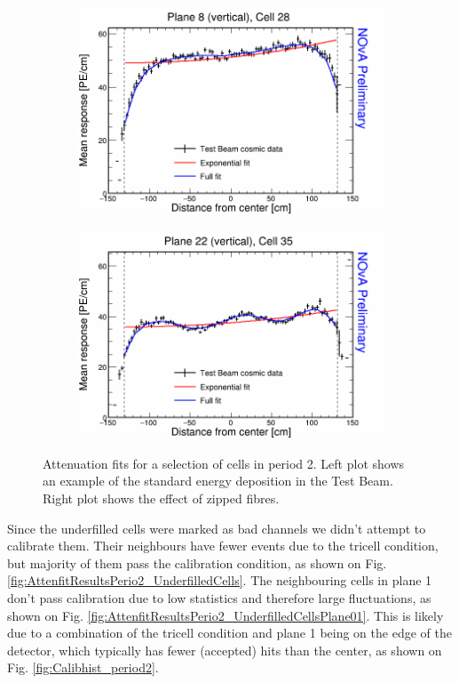 \begin{figure}[h]
  \begin{subfigure}{0.5\textwidth}
    \includegraphics[width=\linewidth]{RelativeCalibrationResults/p2_008_028.png}
  \end{subfigure}
  \begin{subfigure}{0.5\textwidth}
    \includegraphics[width=\linewidth]{RelativeCalibrationResults/p2_022_035.png}
  \end{subfigure}
  \caption{Attenuation fits for a selection of cells in period 2. Left plot shows an example of the standard energy deposition in the Test Beam. Right plot shows the effect of zipped fibres.}
  \label{fig:AttenfitResultsPerio2_ZippedFibers}
\end{figure}

Since the underfilled cells were marked as bad channels we didn't attempt to calibrate them. Their neighbours have fewer events due to the tricell condition, but majority of them pass the calibration condition, as shown on Fig. \ref{fig:AttenfitResultsPerio2_UnderfilledCells}. The neighbouring cells in plane 1 don't pass calibration due to low statistics and therefore large fluctuations, as shown on Fig. \ref{fig:AttenfitResultsPerio2_UnderfilledCellsPlane01}. This is likely due to a combination of the tricell condition and plane 1 being on the edge of the detector, which typically has fewer (accepted) hits than the center, as shown on Fig. \ref{fig:Calibhist_period2}.

